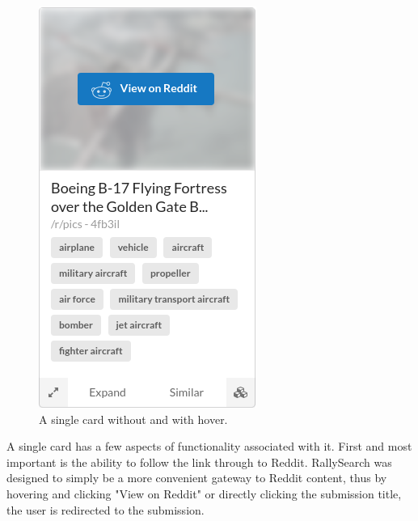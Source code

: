 \documentclass[msc,oneside]{ubcthesis}%
\begin{document}
\begin{figure}[H]
\begin{multicols}{2}
    \includegraphics[width=\linewidth]{card_hover.png}\par 
\end{multicols}
\caption{A single card without and with hover.}
\end{figure}
A single card has a few aspects of functionality associated with it. First and most important is the ability to follow the link through to Reddit. RallySearch was designed to simply be a more convenient gateway to Reddit content, thus by hovering and clicking "View on Reddit" or directly clicking the submission title, the user is redirected to the submission.
\end{document}
